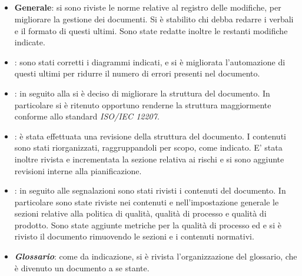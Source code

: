 \documentclass[12pt,a4paper]{article}
\begin{document}
\subsection{\RR}
\begin{itemize}
	\item \textbf{Generale}: si sono riviste le norme relative al registro delle modifiche, per migliorare la gestione dei documenti. Si è stabilito chi debba redarre i verbali e il formato di questi ultimi. Sono state redatte inoltre le restanti modifiche indicate.
	\item \textbf{\AdR}: sono stati corretti i diagrammi indicati, e si è migliorata l'automazione di questi ultimi per ridurre il numero di errori presenti nel documento.
	\item \textbf{\NdP}: in seguito alla \RR si è deciso di migliorare la struttura del documento. In particolare si è ritenuto opportuno renderne la struttura maggiormente conforme allo standard \textit{ISO/IEC 12207}.
	\item \textbf{\PdP}: è stata effettuata una revisione della struttura del documento. I contenuti sono stati riorganizzati, raggruppandoli per scopo, come indicato. E' stata inoltre rivista e incrementata la sezione relativa ai rischi e si sono aggiunte revisioni interne alla pianificazione.
	\item \textbf{\PdQ}: in seguito alle segnalazioni sono stati rivisti i contenuti del documento. In particolare sono state riviste nei contenuti e nell'impostazione generale le sezioni relative alla politica di qualità, qualità di processo e qualità di prodotto. Sono state aggiunte metriche per la qualità di processo ed e si è rivisto il documento rimuovendo le sezioni e i contenuti normativi. 
	\item \textbf{\textit{Glossario}}: come da indicazione, si è rivista l'organizzazione del glossario, che è divenuto un documento a se stante. 
\end{itemize}
\end{document}
